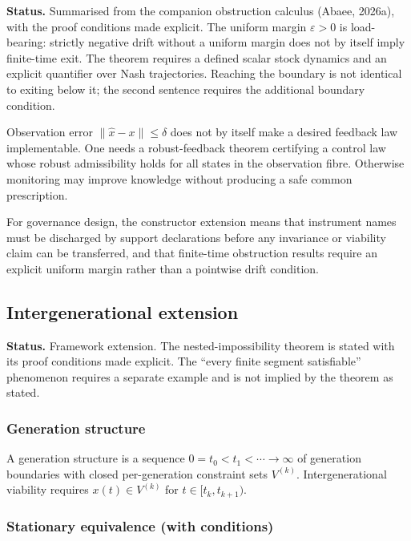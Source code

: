 \noindent\noindent\textbf{Status.} Summarised from the companion obstruction calculus (Abaee, 2026a), with the proof conditions made explicit. The uniform margin $\varepsilon > 0$ is load-bearing: strictly negative drift without a uniform margin does not by itself imply finite-time exit. The theorem requires a defined scalar stock dynamics and an explicit quantifier over Nash trajectories. Reaching the boundary is not identical to exiting below it; the second sentence requires the additional boundary condition.

\begin{remark} Observation error $\|\hat x - x\| \le \delta$ does not by itself make a desired feedback law implementable. One needs a robust-feedback theorem certifying a control law whose robust admissibility holds for all states in the observation fibre. Otherwise monitoring may improve knowledge without producing a safe common prescription.\end{remark}

For governance design, the constructor extension means that instrument names must be discharged by support declarations before any invariance or viability claim can be transferred, and that finite-time obstruction results require an explicit uniform margin rather than a pointwise drift condition.

\subsection{Intergenerational extension}

\noindent\textbf{Status.} Framework extension. The nested-impossibility theorem is stated with its proof conditions made explicit. The ``every finite segment satisfiable'' phenomenon requires a separate example and is not implied by the theorem as stated.

\subsubsection{Generation structure}

A generation structure is a sequence $0 = t_0 < t_1 < \cdots \to \infty$ of generation boundaries with closed per-generation constraint sets $V^{(k)}$. Intergenerational viability requires $x(t) \in V^{(k)}$ for $t \in [t_k, t_{k+1})$.

\subsubsection{Stationary equivalence (with conditions)}

